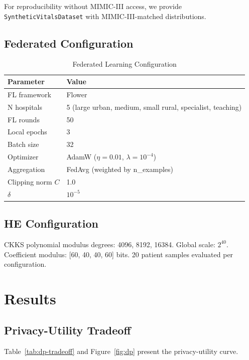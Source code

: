 \documentclass[10pt,journal,compsoc]{IEEEtran}
\begin{document}
For reproducibility without MIMIC-III access, we provide
\texttt{SyntheticVitalsDataset} with MIMIC-III-matched
distributions.

\subsection{Federated Configuration}

\begin{table}[h]
\centering
\caption{Federated Learning Configuration}
\label{tab:fl-config}
\begin{tabular}{@{}ll@{}}
\toprule
Parameter & Value \\ \midrule
FL framework & Flower~\cite{beutel2020flower} \\
N hospitals & 5 (large urban, medium, small rural, specialist, teaching) \\
FL rounds & 50 \\
Local epochs & 3 \\
Batch size & 32 \\
Optimizer & AdamW ($\eta=0.01$, $\lambda=10^{-4}$) \\
Aggregation & FedAvg (weighted by n\_examples) \\
Clipping norm $C$ & 1.0 \\
$\delta$ & $10^{-5}$ \\
\bottomrule
\end{tabular}
\end{table}

\subsection{HE Configuration}

CKKS polynomial modulus degrees: 4096, 8192, 16384.
Global scale: $2^{40}$.
Coefficient modulus: [60, 40, 40, 60] bits.
20 patient samples evaluated per configuration.

\section{Results}
\label{sec:results}

\subsection{Privacy-Utility Tradeoff}

Table~\ref{tab:dp-tradeoff} and Figure~\ref{fig:dp} present
the privacy-utility curve.
\end{document}
